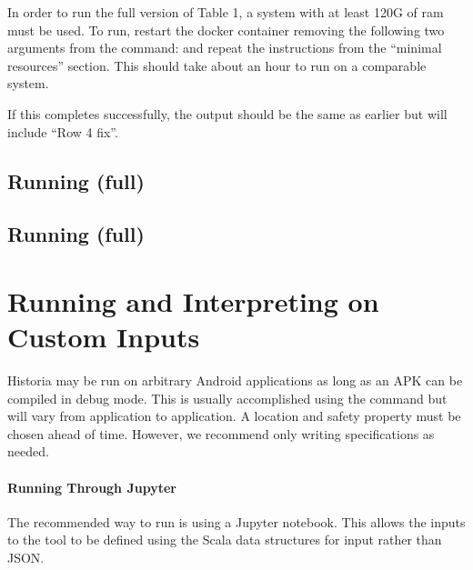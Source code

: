 \documentclass{acmart} %
\begin{document}
In order to run the full version of Table 1, a system with at least 120G of ram must be used. To run, restart the docker container removing the following two arguments from the  command:  and repeat the instructions from the ``minimal resources'' section.  This should take about an hour to run on a comparable system.

If this completes successfully, the output should be the same as earlier but will include ``Row 4 fix''.  


\subsection{Running  (full)}

\TODO{}

\subsection{Running  (full)}

\TODO{}



\section{Running and Interpreting \toolname on Custom Inputs}

Historia may be run on arbitrary Android applications as long as an APK can be compiled in debug mode.  This is usually accomplished using the command  but will vary from application to application. A location and safety property must be chosen ahead of time.  However, we recommend only writing \newls specifications as needed.

\paragraph{Running \toolname Through Jupyter}
The recommended way to run \toolname is using a Jupyter notebook.  This allows the inputs to the tool to be defined using the Scala data structures for input rather than JSON.



\end{document}
